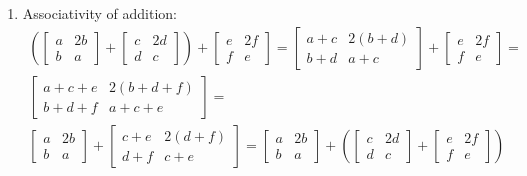 \documentclass[11pt]{article}
\begin{document}
\begin{enumerate}
\item Associativity of addition:
\begin{align*}
  \left(\begin{bmatrix}
    a & 2b \\
    b & a
  \end{bmatrix} + 
  \begin{bmatrix}
    c & 2d \\
    d & c
  \end{bmatrix}\right) +
  \begin{bmatrix}
    e & 2f \\
    f & e
  \end{bmatrix} =
  \begin{bmatrix}
    a + c & 2(b + d) \\
    b + d & a + c
  \end{bmatrix} +
  \begin{bmatrix}
    e & 2f \\
    f & e
  \end{bmatrix} = \\
  \begin{bmatrix}
    a + c + e & 2(b + d + f) \\
    b + d + f & a + c + e
  \end{bmatrix} = \\
  \begin{bmatrix}
    a & 2b \\
    b & a
  \end{bmatrix} + 
  \begin{bmatrix}
    c + e & 2(d + f) \\
    d + f & c + e
  \end{bmatrix} =
  \begin{bmatrix}
    a & 2b \\
    b & a
  \end{bmatrix} + 
  \left(\begin{bmatrix}
    c & 2d \\
    d & c
  \end{bmatrix} +
  \begin{bmatrix}
    e & 2f \\
    f & e
  \end{bmatrix}\right)
\end{align*}


\end{enumerate}
\end{document}

